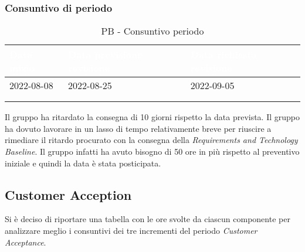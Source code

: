 {            \subsubsection{Consuntivo di periodo} {
                \setlength{\freewidth}{\dimexpr\textwidth-30\tabcolsep}
                \renewcommand{\arraystretch}{1.0}
                \setlength{\aboverulesep}{0pt}
                \setlength{\belowrulesep}{0pt}
                \begin{longtable}{C{.4\freewidth} C{.4\freewidth} C{.4\freewidth}}
                \toprule
                \textcolor{white}{\textbf{Data inizio}}&
                \textcolor{white}{\textbf{Data previsione revisione}}&
                \textcolor{white}{\textbf{Data richiesta revisione}} \\
                \toprule
                \endhead
                    
                2022-08-08 & 2022-08-25 & 2022-09-05 \\
                \\
                \caption{PB - Consuntivo periodo}
          
                \end{longtable}
                Il gruppo ha ritardato la consegna di 10 giorni rispetto la data prevista. Il gruppo ha dovuto lavorare in un lasso di tempo relativamente breve per riuscire a rimediare il ritardo 
                procurato con la consegna della \textit{Requirements and Technology Baseline}. Il gruppo infatti ha avuto bisogno di 50 ore in più rispetto al preventivo iniziale e quindi la data è stata posticipata.
                }
        \subsection{Customer Acception} {
            Si è deciso di riportare una tabella con le ore svolte da ciascun componente per analizzare meglio i consuntivi dei tre incrementi del periodo \textit{Customer Acceptance}.
}}
